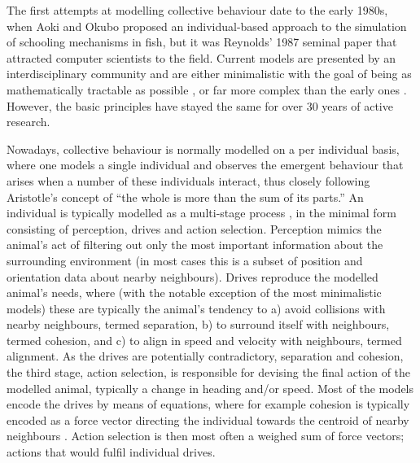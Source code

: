 The first attempts at modelling collective behaviour date to the early 1980s, when Aoki \cite{aoki1982simulation} and Okubo \cite{okubo1986dynamical} proposed an individual-based approach to the simulation of schooling mechanisms in fish, but it was Reynolds' 1987 seminal paper \cite{reynolds1987flocks} that attracted computer scientists to the field. Current models are presented by an interdisciplinary community and are either minimalistic with the goal of being as mathematically tractable as possible \cite{collignon2016stochastic,nagai2015collective,tanner2003fixed,tanner2003dynamic,toner1995longrange,vicsek1995novel}, or far more complex than the early ones \cite{couzin2002collective,demsar2014simulated,hemelrijk2008selforganized,hildenbrandt2010selforganized,pino2015modeling}. However, the basic principles have stayed the same for over 30 years of active research. 

Nowadays, collective behaviour is normally modelled on a per individual basis, where one models a single individual and observes the emergent behaviour that arises when a number of these individuals interact, thus closely following Aristotle's concept of ``the whole is more than the sum of its parts.'' An individual is typically modelled as a multi-stage process \cite{lebarbajec2007boids,fine2013unifying}, in the minimal form consisting of perception, drives and action selection. Perception mimics the animal's act of filtering out only the most important information about the surrounding environment (in most cases this is a subset of position and orientation data about nearby neighbours). Drives reproduce the modelled animal's needs, where (with the notable exception of the most minimalistic models) these are typically the animal's tendency to a) avoid collisions with nearby neighbours, termed separation, b) to surround itself with neighbours, termed cohesion, and c) to align in speed and velocity with neighbours, termed alignment. As the drives are potentially contradictory, \eg separation and cohesion, the third stage, action selection, is responsible for devising the final action of the modelled animal, typically a change in heading and/or speed. Most of the models encode the drives by means of equations, where for example cohesion is typically encoded as a force vector directing the individual towards the centroid of nearby neighbours \cite{vicsek2012collective,lebarbajec2009organized}. Action selection is then most often a weighed sum of force vectors; actions that would fulfil individual drives.

